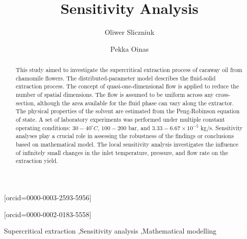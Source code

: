 \documentclass[a4paper,fleqn]{cas-dc}
\begin{document}
 

\title[mode=title]{Sensitivity Analysis}                      


\author[1]{Oliwer Sliczniuk}[orcid=0000-0003-2593-5956]
\cormark[1]

\author[1]{Pekka Oinas}[orcid=0000-0002-0183-5558]


\address[1]{Aalto University, School of Chemical Engineering, Espoo, 02150, Finland}


\begin{abstract}
This study aimed to investigate the supercritical extraction process of caraway oil from chamomile flowers. The distributed-parameter model describes the fluid-solid extraction process. The concept of quasi-one-dimensional flow is applied to reduce the number of spatial dimensions. The flow is assumed to be uniform across any cross-section, although the area available for the fluid phase can vary along the extractor. The physical properties of the solvent are estimated from the Peng-Robinson equation of state. A set of laboratory experiments was performed under multiple constant operating conditions: $30 - 40^\circ C$, $100 - 200$ bar, and $3.33-6.67 \times 10^{-5}$ kg/s. Sensitivity analyses play a crucial role in assessing the robustness of the findings or conclusions based on mathematical model. The local sensitivity analysis investigates the influence of infinitely small changes in the inlet temperature, pressure, and flow rate on the extraction yield.

\end{abstract}

\begin{keywords}
Supercritical extraction \sep Sensitivity analysis \sep Mathematical modelling
\end{keywords}

\maketitle
\end{document}
